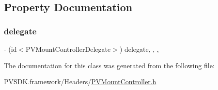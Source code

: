 \subsection{Property Documentation}
\mbox{\label{interface_p_v_mount_controller_a9d39427327fcf8a97a334c4c79e41f6b}} 
\subsubsection{\texorpdfstring{delegate}{delegate}}
{\footnotesize\ttfamily -\/ (id$<$P\+V\+Mount\+Controller\+Delegate$>$) delegate\hspace{0.3cm}{\ttfamily [read]}, {\ttfamily [write]}, {\ttfamily [nonatomic]}, {\ttfamily [weak]}}



The documentation for this class was generated from the following file\+:\begin{DoxyCompactItemize}
\item 
P\+V\+S\+D\+K.\+framework/\+Headers/\hyperlink{_p_v_mount_controller_8h}{P\+V\+Mount\+Controller.\+h}\end{DoxyCompactItemize}
